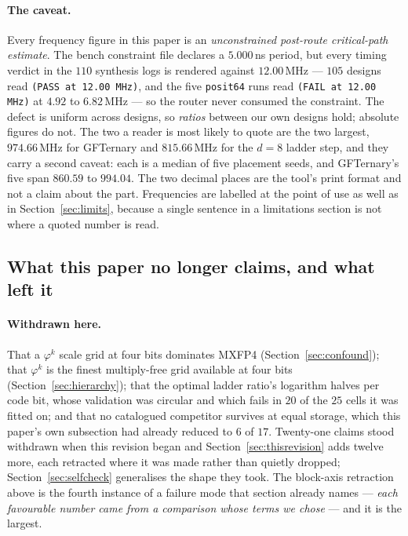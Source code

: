 \documentclass[11pt]{article}
\theoremstyle{definition}
\begin{document}
\paragraph{The caveat.} Every frequency figure in this paper is an
\emph{unconstrained post-route critical-path estimate}. The bench constraint
file declares a $5.000$\,ns period, but every timing verdict in the $110$
synthesis logs is rendered against $12.00$\,MHz --- $105$ designs read
\texttt{(PASS at 12.00 MHz)}, and the five \texttt{posit64} runs read
\texttt{(FAIL at 12.00 MHz)} at $4.92$ to $6.82$\,MHz --- so the router never
consumed the constraint. The defect is uniform across designs, so \emph{ratios}
between our own designs hold; absolute figures do not. The two a reader is most
likely to quote are the two largest, $974.66$\,MHz for GFTernary and
$815.66$\,MHz for the $d{=}8$ ladder step, and they carry a second caveat:
each is a median of five placement seeds, and GFTernary's five span $860.59$ to
$994.04$. The two decimal places are the tool's print format and not a claim
about the part. Frequencies are labelled at the point of use as well as in
Section~\ref{sec:limits}, because a single sentence in a limitations section is
not where a quoted number is read.

\subsection*{What this paper no longer claims, and what left it}

\paragraph{Withdrawn here.} That a $\varphi^{k}$ scale grid at four bits
dominates MXFP4 (Section~\ref{sec:confound}); that $\varphi^{k}$ is the finest
multiply-free grid available at four bits (Section~\ref{sec:hierarchy}); that
the optimal ladder ratio's logarithm halves per code bit, whose validation was
circular and which fails in $20$ of the $25$ cells it was fitted on; and that
no catalogued competitor survives at equal storage, which this paper's own
subsection had already reduced to $6$ of $17$. Twenty-one claims stood
withdrawn when this revision began and Section~\ref{sec:thisrevision} adds
twelve more, each retracted where it was made rather than quietly dropped;
Section~\ref{sec:selfcheck} generalises the shape they took. The block-axis retraction above is the fourth instance of a failure mode
that section already names --- \emph{each favourable number came from a
comparison whose terms we chose} --- and it is the largest.
\end{document}
